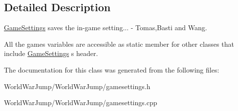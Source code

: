 \subsection{Detailed Description}
\hyperlink{class_game_settings}{Game\+Settings} saves the in-\/game setting... -\/ Tomas,Basti and Wang. 

All the game\textquotesingle{}s variables are accessible as static member for other classes that include \hyperlink{class_game_settings}{Game\+Settings} \textquotesingle{}s header. 

The documentation for this class was generated from the following files\+:\begin{DoxyCompactItemize}
\item 
World\+War\+Jump/\+World\+War\+Jump/gamesettings.\+h\item 
World\+War\+Jump/\+World\+War\+Jump/gamesettings.\+cpp\end{DoxyCompactItemize}

